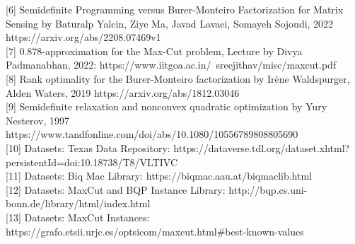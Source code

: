\documentclass{article}
\begin{document}
[6] Semidefinite Programming versus Burer-Monteiro Factorization for Matrix
Sensing by Baturalp Yalcin, Ziye Ma, Javad Lavaei, Somayeh Sojoudi, 2022
https://arxiv.org/abs/2208.07469v1\\

[7] 0.878-approximation for the Max-Cut problem, Lecture by Divya Padmanabhan, 2022: https://www.iitgoa.ac.in/~sreejithav/misc/maxcut.pdf\\

[8] Rank optimality for the Burer-Monteiro factorization by Irène Waldspurger, Alden Waters, 2019 
https://arxiv.org/abs/1812.03046\\

[9] Semidefinite relaxation and nonconvex quadratic optimization by Yury Nesterov, 1997
https://www.tandfonline.com/doi/abs/10.1080/10556789808805690\\

[10] Datasets: Texas Data Repository:
https://dataverse.tdl.org/dataset.xhtml?persistentId=doi:10.18738/T8/VLTIVC\\  

[11] Datasets: Biq Mac Library:
https://biqmac.aau.at/biqmaclib.html\\ 

[12] Datasets: MaxCut and BQP Instance Library:
http://bqp.cs.uni-bonn.de/library/html/index.html\\ 

[13] Datasets: MaxCut Instances:
https://grafo.etsii.urjc.es/optsicom/maxcut.html#best-known-values\\
\end{document}

